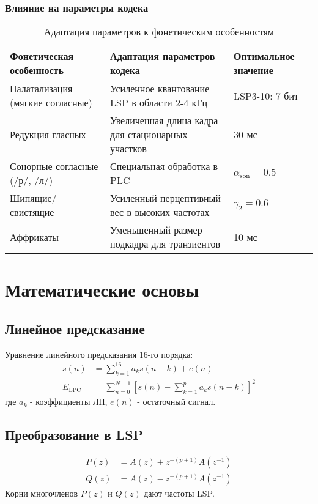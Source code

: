 \documentclass{report}
\begin{document}
	\subsection{Влияние на параметры кодека}
	\begin{table}[H]
		\centering
		\caption{Адаптация параметров к фонетическим особенностям}
		\begin{tabular}{p{4cm}p{6cm}p{3cm}}
			\toprule
			\textbf{Фонетическая особенность} & \textbf{Адаптация параметров кодека} & \textbf{Оптимальное значение} \\
			\midrule
			Палатализация (мягкие согласные) & Усиленное квантование LSP в области 2-4 кГц & LSP3-10: 7 бит \\
			Редукция гласных & Увеличенная длина кадра для стационарных участков & 30 мс \\
			Сонорные согласные (/р/, /л/) & Специальная обработка в PLC & $\alpha_{\text{son}} = 0.5$ \\
			Шипящие/свистящие & Усиленный перцептивный вес в высоких частотах & $\gamma_2 = 0.6$ \\
			Аффрикаты & Уменьшенный размер подкадра для транзиентов & 10 мс \\
			\bottomrule
		\end{tabular}
	\end{table}
	
	\chapter{Математические основы}
	\section{Линейное предсказание}
	Уравнение линейного предсказания 16-го порядка:
	\begin{align}
		s(n) &= \sum_{k=1}^{16} a_k s(n-k) + e(n) \\
		E_{\text{LPC}} &= \sum_{n=0}^{N-1} \left[ s(n) - \sum_{k=1}^{p} a_k s(n-k) \right]^2
	\end{align}
	где $a_k$ - коэффициенты ЛП, $e(n)$ - остаточный сигнал.
	
	\section{Преобразование в LSP}
	\begin{align}
		P(z) &= A(z) + z^{-(p+1)}A(z^{-1}) \\
		Q(z) &= A(z) - z^{-(p+1)}A(z^{-1})
	\end{align}
	Корни многочленов $P(z)$ и $Q(z)$ дают частоты LSP.
	
\end{document}
